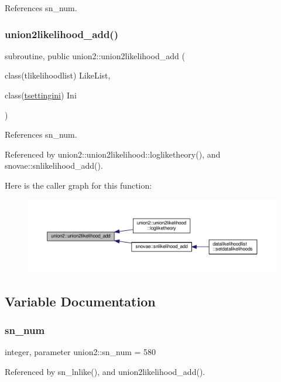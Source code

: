 References sn\+\_\+num.

\mbox{\label{namespaceunion2_a1a2bf6931cf4fb87b54c8c327d598f48}} 
\subsubsection{\texorpdfstring{union2likelihood\+\_\+add()}{union2likelihood\_add()}}
{\footnotesize\ttfamily subroutine, public union2\+::union2likelihood\+\_\+add (\begin{DoxyParamCaption}\item[{class(tlikelihoodlist)}]{Like\+List,  }\item[{class(\mbox{\hyperlink{structsettings_1_1tsettingini}{tsettingini}})}]{Ini }\end{DoxyParamCaption})}



References sn\+\_\+num.



Referenced by union2\+::union2likelihood\+::logliketheory(), and snovae\+::snlikelihood\+\_\+add().

Here is the caller graph for this function\+:
\nopagebreak
\begin{figure}[H]
\begin{center}
\leavevmode
\includegraphics[width=350pt]{namespaceunion2_a1a2bf6931cf4fb87b54c8c327d598f48_icgraph}
\end{center}
\end{figure}


\subsection{Variable Documentation}
\mbox{\label{namespaceunion2_a263e630a36e6cdb0d23c6982c2d13b8e}} 
\subsubsection{\texorpdfstring{sn\+\_\+num}{sn\_num}}
{\footnotesize\ttfamily integer, parameter union2\+::sn\+\_\+num = 580\hspace{0.3cm}{\ttfamily [private]}}



Referenced by sn\+\_\+lnlike(), and union2likelihood\+\_\+add().

